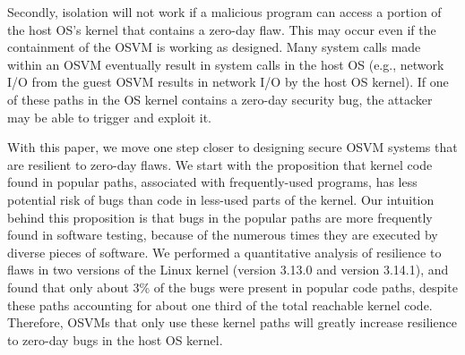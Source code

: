 Secondly, isolation will not work if a malicious
program can access a portion of the host OS's kernel that contains a
zero-day flaw. This may occur even if the containment of the OSVM is
working as designed.
Many system calls made within an OSVM eventually
result in system calls in the host OS (e.g., network I/O from the guest
OSVM results in network I/O by the host OS kernel). If one of these paths in
the OS kernel contains a zero-day security bug, the attacker
may be able to trigger and exploit it.



With this paper, we move one step closer to designing secure OSVM systems that are
resilient to zero-day flaws.
We start with the proposition that kernel code found in popular paths, associated with frequently-used programs,
has less potential risk of bugs than code in less-used parts of the kernel.
Our intuition behind this proposition is that bugs in the popular paths are
more frequently found in software testing, because of the numerous times they are executed by
diverse pieces of software.
We performed a quantitative analysis of resilience
to flaws in two versions of the Linux kernel (version 3.13.0 and version 3.14.1), and
found that only about 3\% of the bugs were present in popular code paths,
despite these paths accounting for about one third of the total reachable
kernel code.
Therefore, OSVMs that only use these kernel paths will
greatly increase resilience to zero-day bugs in the host OS kernel.

